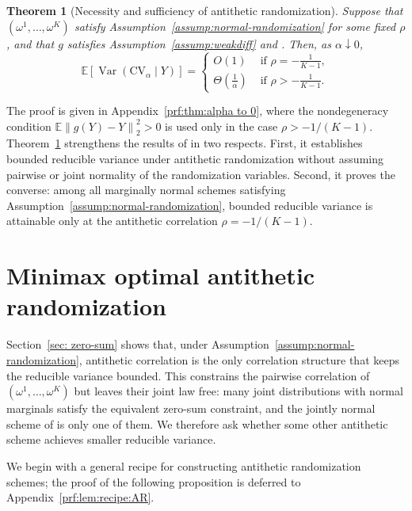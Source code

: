 \documentclass[12pt]{article}
\newtheorem{theorem}{Theorem}[section]
\DeclareMathOperator{\Var}{Var}
\def\E{\mathbb{E}}
\newcommand{\EE}[2][]{\mathbb{E}_{#1}\left[#2\right]}
\newcommand{\norm}[1]{\left\| #1 \right\|}
\theoremstyle{general}
\newcommand{\cv}{{\mathrm{CV}}}
\begin{document}
\begin{theorem}[Necessity and sufficiency of antithetic randomization]
\label{thm:alpha to 0}
Suppose that $(\omega^1,\ldots,\omega^K)$ satisfy Assumption~\ref{assump:normal-randomization} for some fixed $\rho$, and that $g$ satisfies Assumption~\ref{assump:weakdiff} and \sloppy{$\EE{\|g(Y)-Y\|^2_2}>0$}.
Then, as $\alpha\downarrow 0$,
\[
\mathbb{E} \left[\Var \!\left(\cv_{\alpha} \mid Y\right)\right] =\begin{cases}
O(1) &\text{ if } \rho=-\frac{1}{K-1},\\
\Theta(\frac{1}{\alpha}) &\text{ if } \rho>-\frac{1}{K-1}.
\end{cases}
\]
\end{theorem}

The proof is given in Appendix~\ref{prf:thm:alpha to 0}, where the nondegeneracy condition $\E\norm{g(Y)-Y}_2^2>0$ is used only in the case $\rho>-1/(K-1)$.
Theorem~\ref{thm:alpha to 0} strengthens the results of \citet{liu2024cross} in two respects. First, it establishes bounded reducible variance under antithetic randomization without assuming pairwise or joint normality of the randomization variables. Second, it proves the converse: among all marginally normal schemes satisfying Assumption~\ref{assump:normal-randomization}, bounded reducible variance is attainable only at the antithetic correlation $\rho=-1/(K-1)$.





\section{Minimax optimal antithetic randomization}
\label{sec: minimax}

Section~\ref{sec: zero-sum} shows that, under Assumption~\ref{assump:normal-randomization}, antithetic correlation is the only correlation structure that keeps the reducible variance bounded.
This constrains the pairwise correlation of $(\omega^1,\ldots,\omega^K)$ but leaves their joint law free: many joint distributions with normal marginals satisfy the equivalent zero-sum constraint, and the jointly normal scheme of \citet{liu2024cross} is only one of them. We therefore ask whether some other antithetic scheme achieves smaller reducible variance.

We begin with a general recipe for constructing antithetic randomization schemes; the proof of the following proposition is deferred to Appendix~\ref{prf:lem:recipe:AR}.
\end{document}
